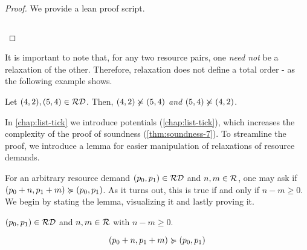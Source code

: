 \begin{proof}
   We provide a lean proof script.
   \inputminted{lean}{formal-proofs/Resources/Relaxation_PO.lean}
\end{proof}

It is important to note that, for any two resource pairs, one \emph{need not} be a relaxation of the other. Therefore, relaxation does not define a total order - as the following example shows.

\begin{example}
   Let \((4,2), (5,4) \in \mathcal{RD}\). Then, \((4,2) \notrelaxation (5,4)\) \emph{and} \((5,4) \notrelaxation (4,2)\).
\end{example}

In \cref{chap:list-tick} we introduce potentials (\cref{chap:list-tick}), which increases the complexity of the proof of soundness (\cref{thm:soundness-7}). To streamline the proof, we introduce a lemma for easier manipulation of relaxations of resource demands.

For an arbitrary resource demand \((p_0, p_1) \in \mathcal{RD}\) and \(n, m \in \mathcal{R}\), one may ask if \((p_0 + n, p_1 + m) \succcurlyeq (p_0, p_1)\). As it turns out, this is true if and only if \(n - m \geq 0\). We begin by stating the lemma, visualizing it and lastly proving it.

\begin{lemma}\label{lemma:pos-relaxation}
   \((p_0, p_1) \in \mathcal{RD}\) and \(n, m \in \mathcal{R}\) with \(n - m \geq 0\).

   \[
      (p_0 + n, p_1 + m) \succcurlyeq (p_0, p_1)
   \]
\end{lemma}


